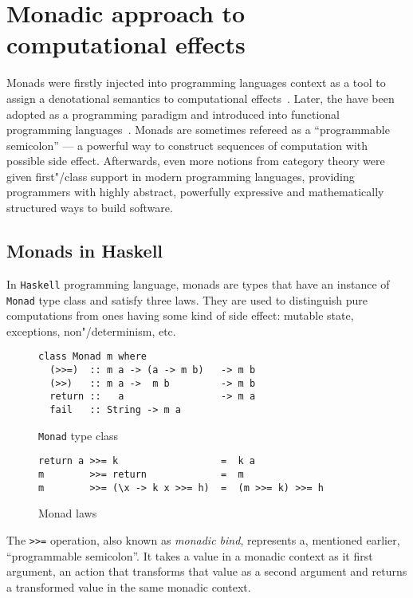 \chapter{Monadic approach to computational effects}
\label{cpt-parsers}

  Monads were firstly injected into programming languages context as a tool to
  assign a denotational semantics to computational effects~\cite{Moggi:1991:NCM:116981.116984}. Later, the have been adopted as a programming
  paradigm and introduced into functional programming languages~\cite{Wadler:1992:EFP:143165.143169}. Monads are sometimes refereed as a ``programmable semicolon'' --- a powerful way to construct sequences of computation with possible side effect. Afterwards, even more notions from category theory were given first"/class support in modern programming languages, providing programmers with highly abstract, powerfully expressive and mathematically structured ways to build software.

    \section{Monads in Haskell}

    In \texttt{Haskell} programming language, monads are types that have an instance of \texttt{Monad} type class and satisfy three laws. They are used
    to distinguish pure computations from ones having some kind of side effect:
    mutable state, exceptions, non"/determinism, etc.

    \begin{figure}[h]
    \begin{lstlisting}
class Monad m where
  (>>=)  :: m a -> (a -> m b)   -> m b
  (>>)   :: m a ->  m b         -> m b
  return ::   a                 -> m a
  fail   :: String -> m a
    \end{lstlisting}
    \caption{\texttt{Monad} type class}
    \label{listing:monadClass}
    \end{figure}

    \begin{figure}[h]
    \begin{lstlisting}
return a >>= k                  =  k a
m        >>= return             =  m
m        >>= (\x -> k x >>= h)  =  (m >>= k) >>= h
    \end{lstlisting}
    \caption{Monad laws}
    \label{listing:monadLaws}
    \end{figure}

    The \lstinline{>>=} operation, also known as \emph{monadic bind}, represents
    a, mentioned earlier, ``programmable semicolon''. It takes a value in a monadic context as it first argument, an action that transforms that value as a second argument and returns a transformed value in the same monadic context.

